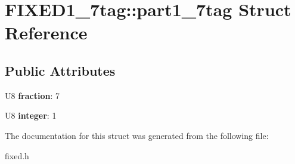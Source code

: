 \hypertarget{struct_f_i_x_e_d1__7tag_1_1part1__7tag}{
\section{FIXED1\_\-7tag::part1\_\-7tag Struct Reference}
\label{struct_f_i_x_e_d1__7tag_1_1part1__7tag}
}
\subsection*{Public Attributes}
\begin{DoxyCompactItemize}
\item 
\hypertarget{struct_f_i_x_e_d1__7tag_1_1part1__7tag_a0cc57a33e5d9652554be6d2d2084b860}{
U8 {\bfseries fraction}: 7}
\label{struct_f_i_x_e_d1__7tag_1_1part1__7tag_a0cc57a33e5d9652554be6d2d2084b860}

\item 
\hypertarget{struct_f_i_x_e_d1__7tag_1_1part1__7tag_a67a1119245f232bdc3be713628b3f492}{
U8 {\bfseries integer}: 1}
\label{struct_f_i_x_e_d1__7tag_1_1part1__7tag_a67a1119245f232bdc3be713628b3f492}

\end{DoxyCompactItemize}


The documentation for this struct was generated from the following file:\begin{DoxyCompactItemize}
\item 
fixed.h\end{DoxyCompactItemize}
